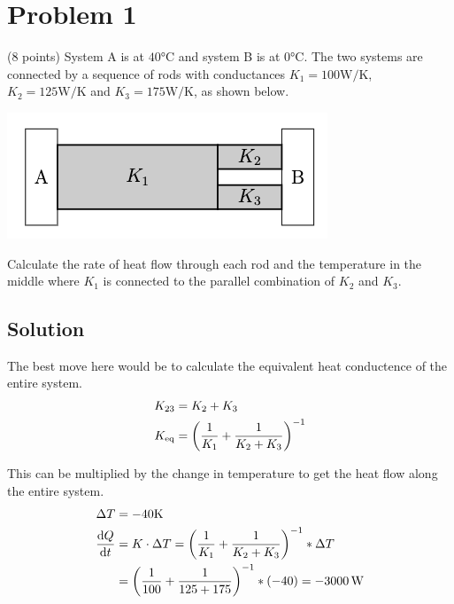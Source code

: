 \documentclass[12pt]{article}
\begin{document}
    \section{Problem 1}
        (8 points) System A is at $40\unit{\celsius}$ and system B is at $0\unit{\celsius}$. 
        The two systems are connected by a sequence of rods with conductances $K_1 = 100 \unit{\watt/\kelvin}$, $K_2 = 125 \unit{\watt/\kelvin}$ and $K_3 = 175 \unit{\watt/\kelvin}$, as shown below.
        \begin{center}
            \includegraphics{picture_1.png}
        \end{center}

        Calculate the rate of heat ﬂow through each rod and the temperature in the middle where $K_1$ is connected to the parallel combination of $K_2$ and $K_3$.

        \subsection{Solution}
            The best move here would be to calculate the equivalent heat conductence of the entire system.
            \begin{align}
                K_{23}  &=  K_2 + K_3\\
                K_{\rm eq}  &=  \left( \frac{1}{K_1} + \frac{1}{K_2 + K_3} \right)^{-1}
            \end{align}

            This can be multiplied by the change in temperature to get the heat flow along the entire system.
            \begin{align}
                \Delta T    &=  -40\unit{\kelvin}\\
                \dv{Q}{t}   &=  K \cdot \Delta T
                    =   \left( \frac{1}{K_1} + \frac{1}{K_2 + K_3} \right)^{-1} * \Delta T\\
                    &=  \left( \frac{1}{100} + \frac{1}{125 + 175} \right)^{-1} * (-40)
                    =   -3000\,\unit{\watt}
            \end{align}
\end{document}
